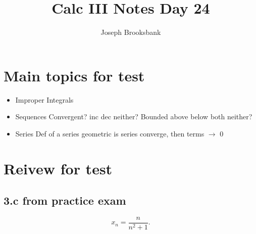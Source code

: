 \documentclass[]{article}
\title{Calc III Notes Day 24}
\author{Joseph Brooksbank}
\begin{document}
\maketitle
\section*{Main topics for test}
\begin{itemize}
        \item Improper Integrals   
     \item Sequences
             \subitem Convergent?
             \subitem inc dec neither?
             \subitem Bounded above below both neither?

             \item Series
                     \subitem Def of a series 
                     \subitem geometric 
                     \subitem is series converge, then terms $\to$ 0 
\end{itemize}

\section*{Reivew for test}
\subsection*{ 3.c from practice exam}
\[
x_n = \frac{n}{n^{2} + 1}
.\]
\end{document}

